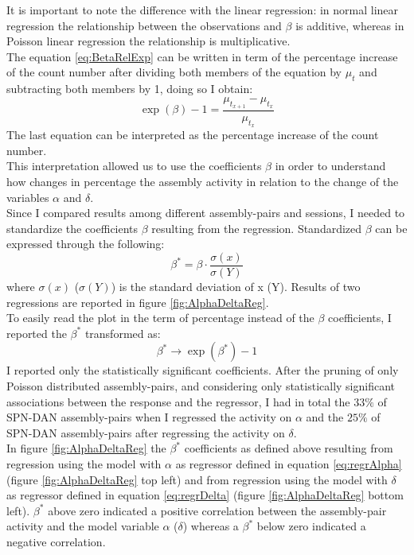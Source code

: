 It is important to note the difference with the linear regression: in normal linear regression the relationship between the observations and $\beta$ is additive, whereas in Poisson linear regression the relationship is multiplicative.\\The equation \ref{eq:BetaRelExp} can be written in term of the percentage increase of the count number after dividing both members of the equation by $\mu_t$ and subtracting both members by 1, doing so I obtain:
\begin{equation}
\exp(\beta)-1=\frac{\mu_{t_{x+1}}-\mu_{t_x}}{\mu_{t_x}}
    \label{eq:BetaPerc}
\end{equation}
The last equation can be interpreted as the percentage increase of the count number.\\This interpretation allowed us to use the coefficients $\beta$ in order to understand how changes in percentage the assembly activity in relation to the change of the variables $\alpha$ and $\delta$.\\Since I compared results among different assembly-pairs and sessions, I needed to standardize the coefficients $\beta$ resulting from the regression. Standardized $\beta$ can be expressed through the following:
\begin{equation}
    \beta^*=\beta\cdot\frac{\sigma(x)}{\sigma(Y)}
    \label{eq:betaStand}
\end{equation}
where $\sigma(x)$ ($\sigma(Y)$) is the standard deviation of x (Y).
Results of two regressions are reported in figure \ref{fig:AlphaDeltaReg}.\\
To easily read the plot in the term of percentage instead of the $\beta$ coefficients, I reported the $\beta^*$ transformed as:
\begin{equation}
    \beta^*\rightarrow \exp(\beta^*)-1
    \label{eq:BetaPlot}
\end{equation}
I reported only the statistically significant coefficients. After the pruning of only Poisson distributed assembly-pairs, and considering only statistically significant associations between the response and the regressor, I had in total the $33\%$ of SPN-DAN assembly-pairs when I regressed the activity on $\alpha$ and the $25\%$ of SPN-DAN assembly-pairs after regressing the activity on $\delta$.\\In figure \ref{fig:AlphaDeltaReg} the $\beta^*$ coefficients as defined above resulting from regression using the model with $\alpha$ as regressor defined in equation \ref{eq:regrAlpha} (figure \ref{fig:AlphaDeltaReg} top left) and from regression using the model with $\delta$ as regressor defined in equation \ref{eq:regrDelta} (figure \ref{fig:AlphaDeltaReg} bottom left). $\beta^*$ above zero indicated a positive correlation between the assembly-pair activity and the model variable $\alpha$ ($\delta$) whereas a $\beta^*$ below zero indicated a negative correlation. 
